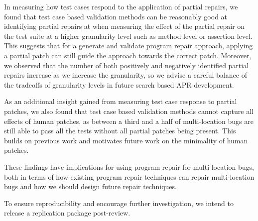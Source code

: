 \documentclass[sigconf, timestamp-false, anonymous=true]{acmart}
\begin{document}
In measuring how test cases respond to the application of partial repairs, we found that 
test case based validation methods can be reasonably good at identifying partial
repairs at when measuring the effect of the partial repair on the test suite at a higher 
granularity level such as method level or assertion level. This suggests that for a generate 
and validate program repair approach, applying a partial patch can still guide the approach 
towards the correct patch. Moreover, 
we observed that the number of both positively and negatively identified partial repairs
increase as we increase the granularity, so we advise a careful balance of the tradeoffs of
granularity levels in future search based APR development.

As an additional insight gained from measuring test case response to partial patches, we 
also found that test case based validation methods cannot capture all effects of human 
patches,
as between a third and a half of multi-location bugs are still able to pass all the tests 
without all partial patches being present. This builds on previous work and motivates 
future work on the minimality of human patches.

These findings have implications for using program repair for multi-location bugs, both in 
terms of how existing program repair techniques can repair multi-location bugs and how 
we should design future repair techniques.

To ensure reproducibility and encourage further investigation, we intend to release a 
replication package post-review.



\end{document}
